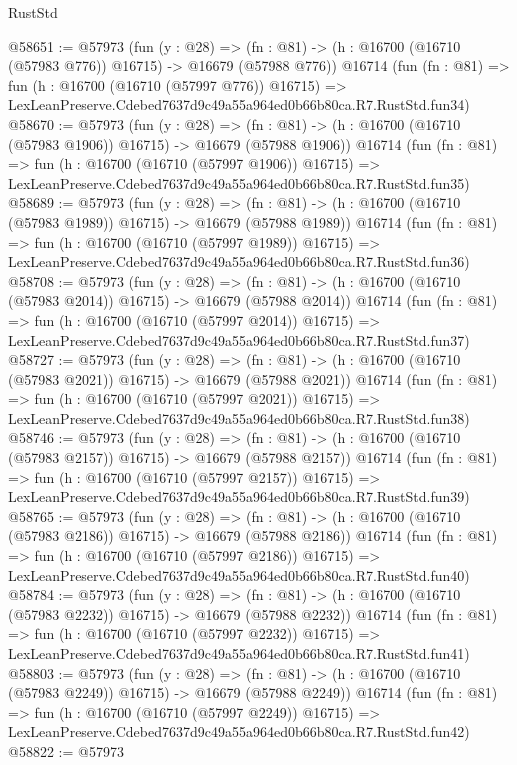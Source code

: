 \begin{lexlean}{RustStd}
\begin{coremodule}
@58651 := @57973
    (fun (y : @28) =>
    (fn : @81) -> (h : @16700 (@16710 (@57983 @776)) @16715) -> @16679 (@57988 @776))
    @16714
    (fun (fn : @81) =>
    fun (h : @16700 (@16710 (@57997 @776)) @16715) =>
    LexLeanPreserve.Cdebed7637d9c49a55a964ed0b66b80ca.R7.RustStd.fun34)
@58670 := @57973
    (fun (y : @28) =>
    (fn : @81) -> (h : @16700 (@16710 (@57983 @1906)) @16715) -> @16679 (@57988 @1906))
    @16714
    (fun (fn : @81) =>
    fun (h : @16700 (@16710 (@57997 @1906)) @16715) =>
    LexLeanPreserve.Cdebed7637d9c49a55a964ed0b66b80ca.R7.RustStd.fun35)
@58689 := @57973
    (fun (y : @28) =>
    (fn : @81) -> (h : @16700 (@16710 (@57983 @1989)) @16715) -> @16679 (@57988 @1989))
    @16714
    (fun (fn : @81) =>
    fun (h : @16700 (@16710 (@57997 @1989)) @16715) =>
    LexLeanPreserve.Cdebed7637d9c49a55a964ed0b66b80ca.R7.RustStd.fun36)
@58708 := @57973
    (fun (y : @28) =>
    (fn : @81) -> (h : @16700 (@16710 (@57983 @2014)) @16715) -> @16679 (@57988 @2014))
    @16714
    (fun (fn : @81) =>
    fun (h : @16700 (@16710 (@57997 @2014)) @16715) =>
    LexLeanPreserve.Cdebed7637d9c49a55a964ed0b66b80ca.R7.RustStd.fun37)
@58727 := @57973
    (fun (y : @28) =>
    (fn : @81) -> (h : @16700 (@16710 (@57983 @2021)) @16715) -> @16679 (@57988 @2021))
    @16714
    (fun (fn : @81) =>
    fun (h : @16700 (@16710 (@57997 @2021)) @16715) =>
    LexLeanPreserve.Cdebed7637d9c49a55a964ed0b66b80ca.R7.RustStd.fun38)
@58746 := @57973
    (fun (y : @28) =>
    (fn : @81) -> (h : @16700 (@16710 (@57983 @2157)) @16715) -> @16679 (@57988 @2157))
    @16714
    (fun (fn : @81) =>
    fun (h : @16700 (@16710 (@57997 @2157)) @16715) =>
    LexLeanPreserve.Cdebed7637d9c49a55a964ed0b66b80ca.R7.RustStd.fun39)
@58765 := @57973
    (fun (y : @28) =>
    (fn : @81) -> (h : @16700 (@16710 (@57983 @2186)) @16715) -> @16679 (@57988 @2186))
    @16714
    (fun (fn : @81) =>
    fun (h : @16700 (@16710 (@57997 @2186)) @16715) =>
    LexLeanPreserve.Cdebed7637d9c49a55a964ed0b66b80ca.R7.RustStd.fun40)
@58784 := @57973
    (fun (y : @28) =>
    (fn : @81) -> (h : @16700 (@16710 (@57983 @2232)) @16715) -> @16679 (@57988 @2232))
    @16714
    (fun (fn : @81) =>
    fun (h : @16700 (@16710 (@57997 @2232)) @16715) =>
    LexLeanPreserve.Cdebed7637d9c49a55a964ed0b66b80ca.R7.RustStd.fun41)
@58803 := @57973
    (fun (y : @28) =>
    (fn : @81) -> (h : @16700 (@16710 (@57983 @2249)) @16715) -> @16679 (@57988 @2249))
    @16714
    (fun (fn : @81) =>
    fun (h : @16700 (@16710 (@57997 @2249)) @16715) =>
    LexLeanPreserve.Cdebed7637d9c49a55a964ed0b66b80ca.R7.RustStd.fun42)
@58822 := @57973

\end{coremodule}
\end{lexlean}
